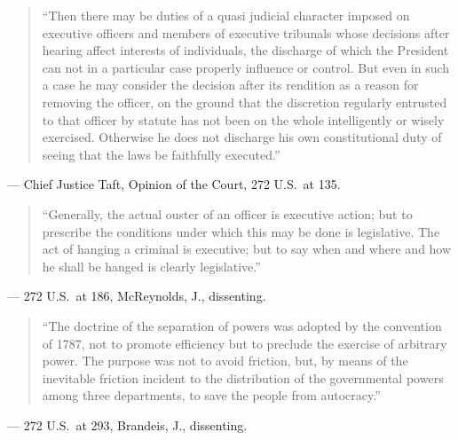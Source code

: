 \documentclass[12pt]{article}
\begin{document}
\begin{quote}
``Then there may be duties of a quasi judicial character imposed on executive officers and members of executive tribunals whose decisions after hearing affect interests of individuals, the discharge of which the President can not in a particular case properly influence or control. But even in such a case he may consider the decision after its rendition as a reason for removing the officer, on the ground that the discretion regularly entrusted to that officer by statute has not been on the whole intelligently or wisely exercised. Otherwise he does not discharge his own constitutional duty of seeing that the laws be faithfully executed.''
\end{quote}
\noindent --- Chief Justice Taft, Opinion of the Court, 272 U.S.\ at 135.

\begin{quote}
``Generally, the actual ouster of an officer is executive action; but to prescribe the conditions under which this may be done is legislative. The act of hanging a criminal is executive; but to say when and where and how he shall be hanged is clearly legislative.''
\end{quote}
\noindent --- 272 U.S.\ at 186, McReynolds, J., dissenting.

\begin{quote}
``The doctrine of the separation of powers was adopted by the convention of 1787, not to promote efficiency but to preclude the exercise of arbitrary power. The purpose was not to avoid friction, but, by means of the inevitable friction incident to the distribution of the governmental powers among three departments, to save the people from autocracy.''
\end{quote}
\noindent --- 272 U.S.\ at 293, Brandeis, J., dissenting.
\end{document}
